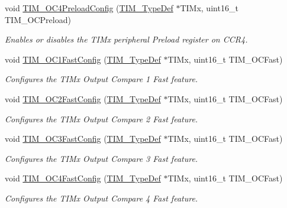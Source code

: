 \begin{DoxyCompactItemize}
void \mbox{\hyperlink{group___t_i_m___private___functions_ga8bf4dfb35ff0c7b494dd96579f50b1ec}{T\+I\+M\+\_\+\+O\+C4\+Preload\+Config}} (\mbox{\hyperlink{struct_t_i_m___type_def}{T\+I\+M\+\_\+\+Type\+Def}} $\ast$T\+I\+Mx, uint16\+\_\+t T\+I\+M\+\_\+\+O\+C\+Preload)
\begin{DoxyCompactList}\small\item\em Enables or disables the T\+I\+Mx peripheral Preload register on C\+C\+R4. \end{DoxyCompactList}\item 
void \mbox{\hyperlink{group___t_i_m___private___functions_gaec82031ca62f31f5483195c09752a83a}{T\+I\+M\+\_\+\+O\+C1\+Fast\+Config}} (\mbox{\hyperlink{struct_t_i_m___type_def}{T\+I\+M\+\_\+\+Type\+Def}} $\ast$T\+I\+Mx, uint16\+\_\+t T\+I\+M\+\_\+\+O\+C\+Fast)
\begin{DoxyCompactList}\small\item\em Configures the T\+I\+Mx Output Compare 1 Fast feature. \end{DoxyCompactList}\item 
void \mbox{\hyperlink{group___t_i_m___private___functions_ga413359c87f46c69f1ffe2dc8fb3a65e7}{T\+I\+M\+\_\+\+O\+C2\+Fast\+Config}} (\mbox{\hyperlink{struct_t_i_m___type_def}{T\+I\+M\+\_\+\+Type\+Def}} $\ast$T\+I\+Mx, uint16\+\_\+t T\+I\+M\+\_\+\+O\+C\+Fast)
\begin{DoxyCompactList}\small\item\em Configures the T\+I\+Mx Output Compare 2 Fast feature. \end{DoxyCompactList}\item 
void \mbox{\hyperlink{group___t_i_m___private___functions_gab2f3698e6e56bd9b0a4be7056ba789e1}{T\+I\+M\+\_\+\+O\+C3\+Fast\+Config}} (\mbox{\hyperlink{struct_t_i_m___type_def}{T\+I\+M\+\_\+\+Type\+Def}} $\ast$T\+I\+Mx, uint16\+\_\+t T\+I\+M\+\_\+\+O\+C\+Fast)
\begin{DoxyCompactList}\small\item\em Configures the T\+I\+Mx Output Compare 3 Fast feature. \end{DoxyCompactList}\item 
void \mbox{\hyperlink{group___t_i_m___private___functions_ga58279a04e8ea5333f1079d3cce8dde12}{T\+I\+M\+\_\+\+O\+C4\+Fast\+Config}} (\mbox{\hyperlink{struct_t_i_m___type_def}{T\+I\+M\+\_\+\+Type\+Def}} $\ast$T\+I\+Mx, uint16\+\_\+t T\+I\+M\+\_\+\+O\+C\+Fast)
\begin{DoxyCompactList}\small\item\em Configures the T\+I\+Mx Output Compare 4 Fast feature. \end{DoxyCompactList}\item 

\end{DoxyCompactItemize}
